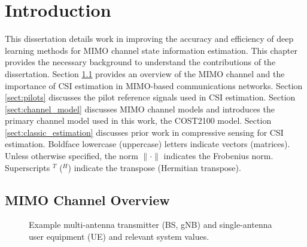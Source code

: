 \chapter{Introduction}
\label{chap:intro}


This dissertation details work in improving the accuracy and efficiency of deep learning methods for MIMO channel state information estimation. This chapter provides the necessary background to understand the contributions of the dissertation. Section \ref{sect:mimo_model} provides an overview of the MIMO channel and the importance of CSI estimation in MIMO-based communications networks. Section \ref{sect:pilots} discusses the pilot reference signals used in CSI estimation. Section \ref{sect:channel_model} discusses MIMO channel models and introduces the primary channel model used in this work, the COST2100 model. Section \ref{sect:classic_estimation} discusses prior work in compressive sensing for CSI estimation.  
Boldface lowercase (uppercase) letters indicate vectors (matrices). Unless otherwise specified, the norm $\|\cdot\|$ indicates the Frobenius norm. Superscripts $^T$ ($^H$) indicate the transpose (Hermitian transpose).

\section{MIMO Channel Overview}
\label{sect:mimo_model}

\begin{figure}[!hbtp]
\centering
{
	\fontsize{8pt}{8pt}
	\def\svgwidth{1.0\columnwidth}
	
}
\caption{Example multi-antenna transmitter (BS, gNB) and single-antenna user equipment (UE) and relevant system values.}
\label{fig:mimo_schematic}
\end{figure}

